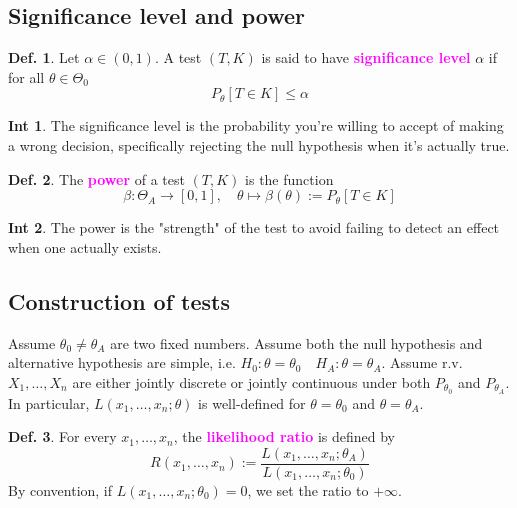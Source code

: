 \documentclass[8pt,a4paper,landscape]{article}
\theoremstyle{definition}
\newtheorem{definition}{Def.}[section]
\theoremstyle{example}
\theoremstyle{intuition}
\newtheorem*{intuition}{Int}
\theoremstyle{definition}
\newcommand{\mydef}[1]{\textcolor{magenta}{\textbf{#1}}}
\begin{document}
\begin{multicols}{3}
			\subsection{Significance level and power}
				\begin{definition}
					Let $\alpha \in (0,1)$. A test $(T, K)$ is said to have \mydef{significance level} $\alpha$ if for all $\theta \in \Theta_0$
					$$
						P_\theta [T \in K] \leq \alpha
					$$
				\end{definition}
				
				\begin{intuition}
					The significance level is the probability you're willing to accept of making a wrong decision, specifically rejecting the null hypothesis when it's actually true.
				\end{intuition}

				\begin{definition}
					The \mydef{power} of a test $(T, K)$ is the function 
					$$
					\beta : \Theta_A \to [0,1], \quad \theta \mapsto \beta(\theta) := P_\theta[T \in K]
					$$
				\end{definition}
					
				\begin{intuition}
					The power is the "strength" of the test to avoid failing to detect an effect when one actually exists.
				\end{intuition}


			\subsection{Construction of tests}
				Assume $\theta_0 \neq \theta_A$ are two fixed numbers. Assume both the null hypothesis and alternative hypothesis are simple, i.e. $H_0 : \theta = \theta_0 \quad H_A : \theta = \theta_A$. Assume r.v. $X_1, \ldots, X_n$ are either jointly discrete or jointly continuous under both $P_{\theta_0}$ and $P_{\theta_A}$. In particular, $L(x_1, \ldots, x_n ; \theta)$ is well-defined for $\theta = \theta_0$ and $\theta = \theta_A$.

				\begin{definition}
					For every $x_1, \ldots, x_n$, the \mydef{likelihood ratio} is defined by 
					$$
						R(x_1, \ldots, x_n) := \frac{L(x_1, \ldots, x_n ; \theta_A)}{L(x_1, \ldots, x_n ; \theta_0)}
					$$
					By convention, if $L(x_1, \ldots, x_n ; \theta_0) = 0$, we set the ratio to $+\infty$.
				\end{definition}


\end{multicols}
\end{document}
